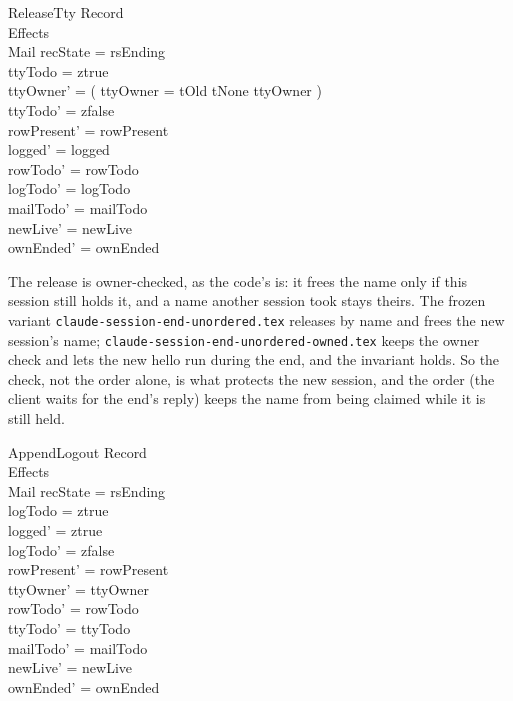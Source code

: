 \documentclass[a4paper,10pt,fleqn]{article}
\begin{document}
\begin{schema}{ReleaseTty}
  \Xi Record \\
  \Delta Effects \\
  \Xi Mail
  \where
  recState = rsEnding \\
  ttyTodo = ztrue \\
  ttyOwner' = ( \IF ttyOwner = tOld \THEN tNone \ELSE ttyOwner ) \\
  ttyTodo' = zfalse \\
  rowPresent' = rowPresent \\
  logged' = logged \\
  rowTodo' = rowTodo \\
  logTodo' = logTodo \\
  mailTodo' = mailTodo \\
  newLive' = newLive \\
  ownEnded' = ownEnded
\end{schema}

The release is owner-checked, as the code's is: it frees the name only if this
session still holds it, and a name another session took stays theirs.  The
frozen variant \texttt{claude-session-end-unordered.tex} releases by name and
frees the new session's name; \texttt{claude-session-end-unordered-owned.tex}
keeps the owner check and lets the new hello run during the end, and the
invariant holds.  So the check, not the order alone, is what protects the new
session, and the order (the client waits for the end's reply) keeps the name
from being claimed while it is still held.

\begin{schema}{AppendLogout}
  \Xi Record \\
  \Delta Effects \\
  \Xi Mail
  \where
  recState = rsEnding \\
  logTodo = ztrue \\
  logged' = ztrue \\
  logTodo' = zfalse \\
  rowPresent' = rowPresent \\
  ttyOwner' = ttyOwner \\
  rowTodo' = rowTodo \\
  ttyTodo' = ttyTodo \\
  mailTodo' = mailTodo \\
  newLive' = newLive \\
  ownEnded' = ownEnded
\end{schema}
\end{document}
